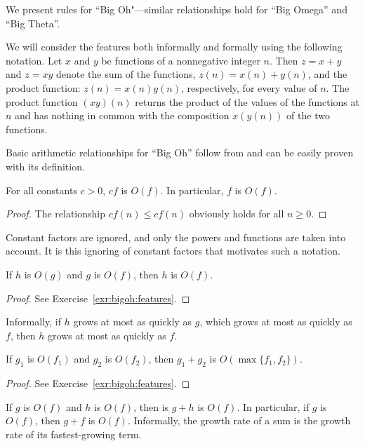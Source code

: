 We present rules for ``Big Oh"---similar relationships hold for ``Big Omega'' 
and ``Big Theta''.

We will consider the features both informally and formally using the
following notation. Let $x$ and $y$ be functions of a nonnegative
integer $n$. Then $z=x+y$ and $z=xy$ denote the sum of the functions,
$z(n) = x(n)+y(n)$, and the product function: $z(n) = x(n)y(n)$,
respectively, for every value of $n$. The product function $(xy)(n)$
returns the product of the values of the functions at $n$ and has
nothing in common with the composition $x(y(n))$ of the two functions.

Basic arithmetic relationships for ``Big Oh''
follow from and can be easily proven with its definition. 

\begin{Lemma}[Scaling] \label{l:bigoh:1}
For all constants $c > 0$, $c  f$ is $O(f)$. In particular, $f$ is $O(f)$. 
\end{Lemma}

\begin{proof}
The relationship \(cf(n) \leq c f(n)\) obviously holds for all \(n\geq 0\).
\end{proof}

Constant factors are ignored, and only the powers and functions are
taken into account. It is this ignoring of constant factors that
motivates such a notation.

\begin{Lemma}[Transitivity] \label{l:bigoh:2}
If $h$ is $O(g)$ and $g$ is $O(f)$, then $h$ is $O(f)$.
\end{Lemma}
\begin{proof}
See Exercise~\ref{exr:bigoh:features}.
\end{proof}

Informally, if $h$ grows at most as quickly as $g$, which grows 
at most as quickly as $f$, then $h$ grows at most as quickly as $f$. 

\begin{Lemma} \label{l:bigoh:3}
If $g_{1}$ is $O(f_{1})$ and 
$g_{2}$ is $O(f_{2})$, then 
$g_{1}+g_{2}$ is $O(\max \{ f_{1},f_{2} \} )$. 
\end{Lemma}
\begin{proof}
See Exercise~\ref{exr:bigoh:features}.
\end{proof}

If $g$ is $O(f)$ and $h$ is $O(f)$, then is $g+h$ is $O(f)$. In particular, 
if $g$ is $O(f)$, then $g+f$ is $O(f)$. Informally, the growth rate of a sum 
is the growth rate of its fastest-growing term.
 
